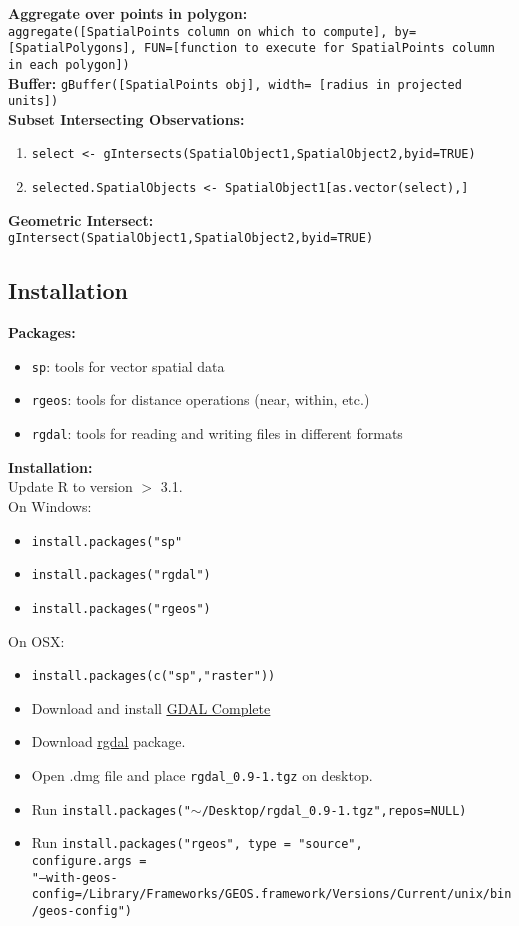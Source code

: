 \documentclass[10pt]{article}
\begin{document}
\textbf{Aggregate over points in polygon:} \\
\texttt{aggregate([SpatialPoints column on which to compute], by=[SpatialPolygons], FUN=[function to execute for SpatialPoints column in each polygon])}\\
\textbf{Buffer:} \texttt{gBuffer([SpatialPoints obj], width= [radius in projected units])}\\
\textbf{Subset Intersecting Observations:}
\begin{enumerate}
	\item \texttt{select <- gIntersects(SpatialObject1,SpatialObject2,byid=TRUE)} 
	\item \texttt{selected.SpatialObjects <- SpatialObject1[as.vector(select),]}
\end{enumerate} 
\textbf{Geometric Intersect:} \texttt{gIntersect(SpatialObject1,SpatialObject2,byid=TRUE)}


\hrulefill 	
\subsection*{Installation}
\textbf{Packages:}
\begin{itemize}
	\item \texttt{sp}: tools for vector spatial data
	\item \texttt{rgeos}: tools for distance operations (near, within, etc.)
	\item \texttt{rgdal}: tools for reading and writing files in different formats
\end{itemize}
\textbf{Installation:}\\
Update R to version $>$ 3.1.\\
On Windows:
\begin{itemize}
	\item \texttt{install.packages("sp"}
	\item \texttt{install.packages("rgdal")}
	\item \texttt{install.packages("rgeos")}
\end{itemize}
On OSX:
	\begin{itemize}
		\item \texttt{install.packages(c("sp","raster"))}
		\item Download and install 	\href{http://www.kyngchaos.com/files/software/frameworks/GDAL_Complete-1.11.dmg}{\underline{GDAL Complete}}
		\item Download \href{http://www.kyngchaos.com/files/software/frameworks/rgdal-0.9.1-1.dmg}{\underline{rgdal}} package. 
		\item Open .dmg file and place \texttt{rgdal\_0.9-1.tgz} on desktop.
		\item Run \texttt{install.packages("$\sim$/Desktop/rgdal\_0.9-1.tgz",repos=NULL)}
		\item Run \texttt{install.packages("rgeos", type = "source",} \\
		\texttt{configure.args =} \\
\texttt{"--with-geos-config=/Library/Frameworks/GEOS.framework/Versions/Current/unix/bin/geos-config")}
	\end{itemize}
\end{document}

